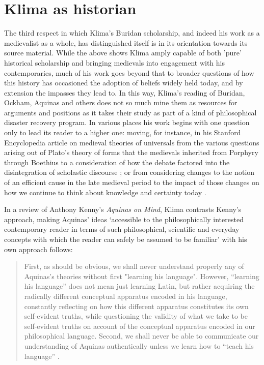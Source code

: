 \documentclass[]{article}
\begin{document}
\section{Klima as historian}
The third respect in which Klima's Buridan scholarship, 
and indeed his work as a medievalist as a whole, 
has distinguished itself 
is in its orientation 
towards its source material. 
While the above shows Klima amply capable of 
both 
'pure' historical scholarship 
and 
bringing medievals into engagement with his contemporaries, 
much of his work goes beyond that to 
broader questions of 
how this history has occasioned
the adoption of beliefs widely held today,
and by extension the impasses they lead to.
In this way, 
Klima's reading of Buridan, 
Ockham, 
Aquinas 
and others 
does not so much mine them as resources for arguments and positions 
as it takes their study as part of a kind of philosophical disaster recovery program. 
In various places 
his work begins with one question only to lead its reader to a higher one: 
moving, 
for instance, 
in his Stanford Encyclopedia article on medieval theories of universals 
from the various questions arising out of Plato's theory of forms 
that the medievals inherited 
from Porphyry 
through Boethius
to a consideration of how the debate factored into the disintegration of scholastic discourse \autocite{sep-universals-medieval}; 
or from considering changes to the notion of an efficient cause in the late medieval period 
to the impact of those changes 
on how we continue to think about knowledge and certainty today \autocite{Klima2013}.

In a review of Anthony Kenny's \emph{Aquinas on Mind}, 
Klima contrasts Kenny's approach, 
making Aquinas' ideas 
`accessible to the philosophically interested contemporary reader 
in terms of such philosophical, scientific and everyday
concepts with which the reader can safely be assumed to be familiar'\autocite[113]{Klima1998}
with his own approach follows:

\begin{quote}
	First, as should be obvious, we shall never understand properly any of
	Aquinas's theories without first "learning his language". However,
	``learning his language'' does not mean just learning Latin, but rather
	acquiring the radically different conceptual apparatus encoded in his
	language, constantly reflecting on how this different apparatus constitutes its own self-evident truths, while questioning the validity of what
	we take to be self-evident truths on account of the conceptual apparatus
	encoded in our philosophical language. 
	Second, we shall never be able to
	communicate our understanding of Aquinas authentically unless we
	learn how to ``teach his language''  \autocite[115]{Klima1998}.
\end{quote} 
\end{document}
